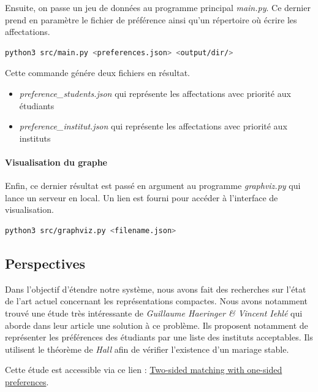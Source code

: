 \documentclass[12pt,titlepage]{article}
\begin{document}
Ensuite, on passe un jeu de données au programme principal \textit{main.py}. Ce dernier prend en paramètre le fichier de préférence ainsi qu'un répertoire où écrire les affectations.

\begin{lstlisting}[language=bash,caption="Commande qui exécute le programme principal"]  
  python3 src/main.py <preferences.json> <output/dir/>
\end{lstlisting}

Cette commande génére deux fichiers en résultat. 
\begin{itemize}
  \item \textit{preference\_students.json} qui représente les affectations avec priorité aux étudiants
  \item \textit{preference\_institut.json} qui représente les affectations avec priorité aux instituts
\end{itemize}

\paragraph{Visualisation du graphe}

Enfin, ce dernier résultat est passé en argument au programme \textit{graphviz.py} qui lance un serveur en local. Un lien est fourni pour accéder à l'interface de visualisation.

\begin{lstlisting}[language=bash,caption="Commande qui lance la visualisation" ]  
  python3 src/graphviz.py <filename.json>
\end{lstlisting}

\subsection{Perspectives}

Dans l'objectif d'étendre notre système, nous avons fait des recherches sur l'état de l'art actuel concernant les représentations compactes. Nous avons notamment trouvé une étude très intéressante de \textit{Guillaume Haeringer \& Vincent Iehlé} qui aborde dans leur article une solution à ce problème. Ils proposent notamment de représenter les préférences des étudiants par une liste des instituts acceptables. Ils utilisent le théorème de \textit{Hall} afin de vérifier l'existence d'un mariage stable.


Cette étude est accessible via ce lien : \href{https://halshs.archives-ouvertes.fr/halshs-00980794/document}{Two-sided matching with one-sided preferences}.
\end{document}
